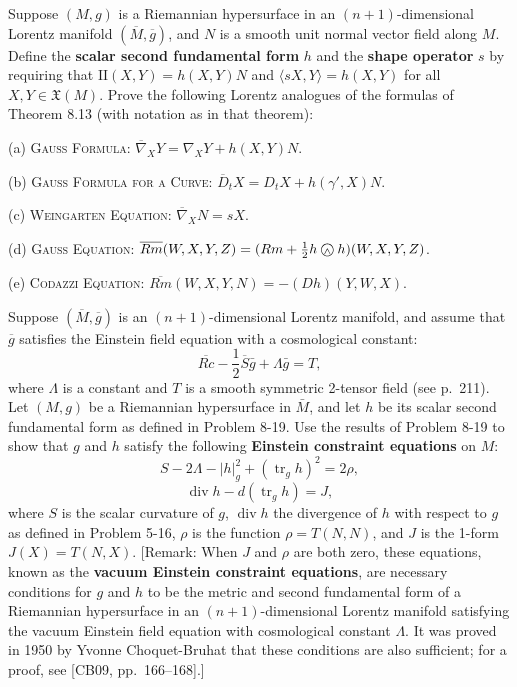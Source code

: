 \begin{exercise}
\label{prob:lorentz-hypersurface-formulas}
Suppose $(M, g)$ is a Riemannian hypersurface in an $(n + 1)$-dimensional Lorentz manifold $(\overline{M}, \overline{g})$, and $N$ is a smooth unit normal vector field along $M$. Define the \textbf{scalar second fundamental form} $h$ and the \textbf{shape operator} $s$ by requiring that $\text{II}(X, Y) = h(X, Y)N$ and $\langle sX, Y \rangle = h(X, Y)$ for all $X, Y \in \mathfrak{X}(M)$. Prove the following Lorentz analogues of the formulas of Theorem 8.13 (with notation as in that theorem):

(a) \textsc{Gauss Formula:} $\overline{\nabla}_X Y = \nabla_X Y + h(X, Y)N$.

(b) \textsc{Gauss Formula for a Curve:} $\overline{D}_t X = D_t X + h(\gamma', X)N$.

(c) \textsc{Weingarten Equation:} $\overline{\nabla}_X N = sX$.

(d) \textsc{Gauss Equation:} $\overline{Rm}(W, X, Y, Z) = (Rm + \frac{1}{2} h \owedge h)(W, X, Y, Z)$.

(e) \textsc{Codazzi Equation:} $\overline{Rm}(W, X, Y, N) = -(Dh)(Y, W, X)$.
\end{exercise}

\begin{exercise}
\label{prob:lorentz-einstein-field-equation}
Suppose $(\overline{M}, \overline{g})$ is an $(n + 1)$-dimensional Lorentz manifold, and assume that $\overline{g}$ satisfies the Einstein field equation with a cosmological constant:
\[
\overline{Rc} - \frac{1}{2}\overline{S}\bar{g} + \Lambda\bar{g} = T,
\]
where $\Lambda$ is a constant and $T$ is a smooth symmetric 2-tensor field (see p.\ 211). Let $(M, g)$ be a Riemannian hypersurface in $\bar{M}$, and let $h$ be its scalar second fundamental form as defined in Problem 8-19. Use the results of Problem 8-19 to show that $g$ and $h$ satisfy the following \textbf{Einstein constraint equations} on $M$:
\[
S - 2\Lambda - |h|_g^2 + (\operatorname{tr}_g h)^2 = 2\rho,
\]
\[
\operatorname{div} h - d(\operatorname{tr}_g h) = J,
\]
where $S$ is the scalar curvature of $g$, $\operatorname{div} h$ the divergence of $h$ with respect to $g$ as defined in Problem 5-16, $\rho$ is the function $\rho = T(N, N)$, and $J$ is the 1-form $J(X) = T(N, X)$. [Remark: When $J$ and $\rho$ are both zero, these equations, known as the \textbf{vacuum Einstein constraint equations}, are necessary conditions for $g$ and $h$ to be the metric and second fundamental form of a Riemannian hypersurface in an $(n+1)$-dimensional Lorentz manifold satisfying the vacuum Einstein field equation with cosmological constant $\Lambda$. It was proved in 1950 by Yvonne Choquet-Bruhat that these conditions are also sufficient; for a proof, see [CB09, pp.\ 166--168].]
\end{exercise}

